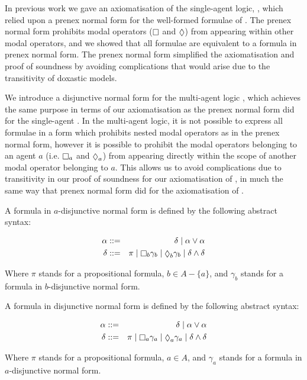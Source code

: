 
In previous work we gave an axiomatisation of the single-agent logic,
\logicKDiF{}, which relied upon a prenex normal form for the well-formed
formulae of \logicKDi{}. The prenex normal form prohibits modal operators
($\knows$ and $\suspects$) from appearing within other modal operators, and we
showed that all \logicKDi{} formulae are equivalent to a formula in prenex
normal form. The prenex normal form simplified the axiomatisation and proof of
soundness by avoiding complications that would arise due to the transitivity of
doxastic models.

We introduce a disjunctive normal form for the multi-agent logic \logicKD{},
which achieves the same purpose in terms of our axiomatisation as the prenex
normal form did for the single-agent \logicKD{}. In the multi-agent logic, it is
not possible to express all formulae in a form which prohibits nested modal
operators as in the prenex normal form, however it is possible to prohibit the
modal operators belonging to an agent $a$ (i.e. $\knows_a$ and $\suspects_a$)
from appearing directly within the scope of another modal operator belonging to
$a$. This allows us to avoid complications due to transitivity in our proof of
soundness for our axiomatisation of \logicKDF{}, in much the same way that
prenex normal form did for the axiomatisation of \logicKDiF{}.

\begin{definition}
A formula in $a$-disjunctive normal form is defined by the following abstract syntax:

\begin{eqnarray*}
\alpha &::=& \delta \bnfalt \alpha \lor \alpha\\
\delta &::=& \pi \bnfalt \knows_b \gamma_b \bnfalt \suspects_b \gamma_b \bnfalt
\delta \land \delta\\
\end{eqnarray*}

Where $\pi$ stands for a propositional formula, $b \in A - \{a\}$, and
$\gamma_b$ stands for a formula in $b$-disjunctive normal form.

A formula in disjunctive normal form is defined by the following abstract syntax:

\begin{eqnarray*}
\alpha &::=& \delta \bnfalt \alpha \lor \alpha\\
\delta &::=& \pi \bnfalt \knows_a \gamma_a \bnfalt \suspects_a \gamma_a \bnfalt
\delta \land \delta\\
\end{eqnarray*}

Where $\pi$ stands for a propositional formula, $a \in A$, and $\gamma_a$
stands for a formula in $a$-disjunctive normal form.
\end{definition}

